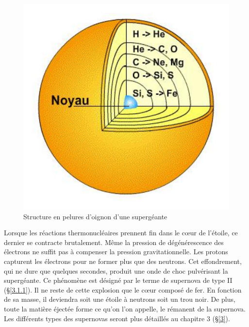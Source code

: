 \begin{figure}[H]
	\centering
	\includegraphics[scale=0.3]{images/oignon}
	\caption[Structure en pelures d'oignon d'une supergéante\newline \url{https://media4.obspm.fr/public/ressources\_lu/pages\_vie-mort/impression.html}]{Structure en pelures d'oignon d'une supergéante}
	\label{Fig. 2.6}
\end{figure}\newpage

Lorsque les réactions thermonucléaires prennent fin dans le cœur de l’étoile, ce dernier se contracte brutalement. Même la pression de dégénérescence des électrons ne suffit pas à compenser la pression gravitationnelle. Les protons capturent les électrons pour ne former plus que des neutrons. Cet effondrement, qui ne dure que quelques secondes, produit une onde de choc pulvérisant la supergéante. Ce phénomène est désigné par le terme de supernova de type II (§\ref{3.1.1}). Il ne reste de cette explosion que le cœur composé de fer. En fonction de sa masse, il deviendra soit une étoile à neutrons soit un trou noir. De plus, toute la matière éjectée forme ce qu’on l’on appelle, le rémanent de la supernova. Les différents types des supernovas seront plus détaillés au chapitre 3 (§\ref{3}).

